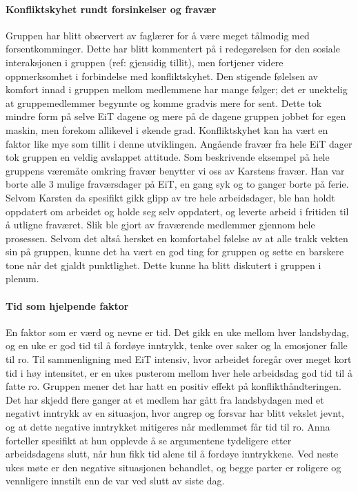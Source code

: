 \paragraph{Konfliktskyhet rundt forsinkelser og fravær}
Gruppen har blitt observert av faglærer for å være meget tålmodig med forsentkomminger. Dette har blitt kommentert på i redegørelsen for den sosiale interaksjonen i gruppen (ref: gjensidig tillit), men fortjener videre oppmerksomhet i forbindelse med konfliktskyhet. Den stigende følelsen av komfort innad i gruppen mellom medlemmene har mange følger; det er unektelig at gruppemedlemmer begynnte og komme gradvis mere for sent. Dette tok mindre form på selve EiT dagene og mere på de dagene gruppen jobbet for egen maskin, men forekom allikevel i økende grad. Konfliktskyhet kan ha vært en faktor like mye som tillit i denne utviklingen. Angående fravær fra hele EiT dager tok gruppen en veldig avslappet attitude. Som beskrivende eksempel på hele gruppens væremåte omkring fravær benytter vi oss av Karstens fravær. Han var borte alle 3 mulige fraværsdager på EiT, en gang syk og to ganger borte på ferie. Selvom Karsten da spesifikt gikk glipp av tre hele arbeidsdager, ble han holdt oppdatert om arbeidet og holde seg selv oppdatert, og leverte arbeid i fritiden til å utligne fraværet. Slik ble gjort av fraværende medlemmer gjennom hele prosessen.
Selvom det altså hersket en komfortabel følelse av at alle trakk vekten sin på gruppen, kunne det ha vært en god ting for gruppen og sette en barskere tone når det gjaldt punktlighet. Dette kunne ha blitt diskutert i gruppen i plenum.

\paragraph{Tid som hjelpende faktor}
En faktor som er værd og nevne er tid. Det gikk en uke mellom hver landsbydag, og en uke er god tid til å fordøye inntrykk, tenke over saker og la emosjoner falle til ro. Til sammenligning med EiT intensiv, hvor arbeidet foregår over meget kort tid i høy intensitet, er en ukes pusterom mellom hver hele arbeidsdag god tid til å fatte ro. Gruppen mener det har hatt en positiv effekt på konflikthåndteringen. Det har skjedd flere ganger at et medlem har gått fra landsbydagen med et negativt inntrykk av en situasjon, hvor angrep og forsvar har blitt vekslet jevnt, og at dette negative inntrykket mitigeres når medlemmet får tid til ro. Anna forteller spesifikt at hun opplevde å se argumentene tydeligere etter arbeidsdagens slutt, når hun fikk tid alene til å fordøye inntrykkene. Ved neste ukes møte er den negative situasjonen behandlet, og begge parter er roligere og vennligere innstilt enn de var ved slutt av siste dag. 


